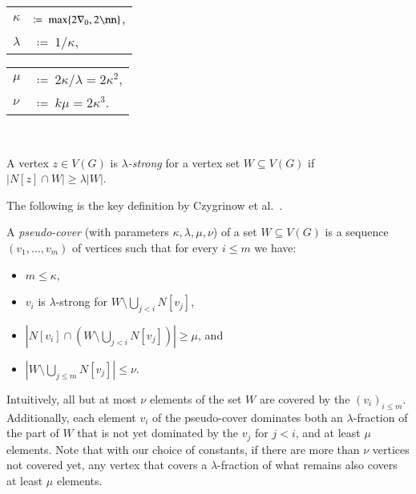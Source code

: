 \begin{tcolorbox}
\hfill
\begin{tabular}{l l}
$\kappa$       & $\coloneqq~ \max\{2\nabla_0,2\nn\}$,\\
$\lambda$  & $\coloneqq~ 1/\kappa$,
\vspace{-1mm}
\end{tabular}
\hfill
\begin{tabular}{l l}
$\mu$    & $\coloneqq~ 2\kappa/\lambda=2\kappa^2$,\\
$\nu$       & $\coloneqq~ k\mu = 2\kappa^3$.
\end{tabular}
\hfill~
\end{tcolorbox}


\begin{definition}
A vertex $z\in V(G)$ is \emph{$\lambda$-strong} for a vertex set $W\subseteq V(G)$ if $|N[z]\cap W|\geq \lambda|W|$.
\end{definition}

The following is the key definition by Czygrinow et al.~\cite{czygrinow2018distributed}.

\begin{definition}
  A \emph{pseudo-cover} (with parameters $\kappa, \lambda, \mu, \nu$)
  of a set $W\subseteq V(G)$ is a
  sequence $(v_1,\ldots, v_m)$ of vertices
  such that for every $i\le m$ we have:\\[-6mm]
  \begin{itemize}
    \item $m\leq \kappa$,\\[-5mm]
    \item $v_i$ is $\lambda$-strong for $W\setminus\bigcup_{j<i}N[v_j]$,\\[-5mm]
    \item $|N[v_i]\cap (W\setminus\bigcup_{j<i} N[v_j])|\geq \mu$, and\\[-5mm]
    \item $|W\setminus \bigcup_{j\le m}N[v_j]|\leq \nu$.
  \end{itemize}
\end{definition}
Intuitively, all but at most $\nu$ elements of the set $W$ are covered by the $(v_i)_{i\le m}$.
Additionally, each element $v_i$ of the pseudo-cover dominates both an
$\lambda$-fraction of the part of $W$ that is not yet dominated by the $v_j$
for $j<i$, and at least $\mu$ elements.
Note that with our choice of constants, if there are more than $\nu$ vertices not
covered yet, any vertex that covers a $\lambda$-fraction of what remains also
covers at least $\mu$ elements.


